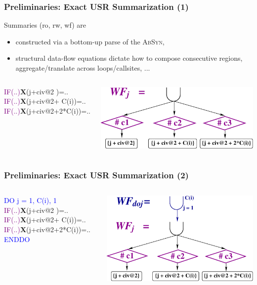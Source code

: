 \documentclass{beamer}
\newcommand{\blue}[1]{\textcolor{Blue}{{#1}}}
\newcommand{\purple}[1]{\textcolor{Purple}{{#1}}}
\begin{document}
\begin{frame}[fragile,t]
\frametitle{Preliminaries: Exact USR Summarization (1)}

Summaries ({\sc ro}, {\sc rw}, {\sc wf}) are
\begin{itemize}
    \item constructed via a bottom-up parse of the \textsc{AbSyn},
    \item structural data-flow equations dictate how to compose consecutive regions,
            aggregate/translate across loops/callsites, ...
\end{itemize}
\bigskip

\begin{columns}
\begin{colorcode}[fontsize=\small]
   \purple{IF(..)}{\bf{}X}(j+civ@2       )=..
   \purple{IF(..)}{\bf{}X}(j+civ@2+  C(i))=..
   \purple{IF(..)}{\bf{}X}(j+civ@2+2*C(i))=..
\end{colorcode}
\includegraphics[height=15ex]{Figures/WFj_USR}
\end{columns}

\end{frame}

\begin{frame}[fragile,t]
\frametitle{Preliminaries: Exact USR Summarization (2)}

\bigskip

\begin{columns}
\begin{colorcode}[fontsize=\small]
  \blue{DO j = 1, C(i), 1}
   \purple{IF(..)}{\bf{}X}(j+civ@2       )=..
   \purple{IF(..)}{\bf{}X}(j+civ@2+  C(i))=..
   \purple{IF(..)}{\bf{}X}(j+civ@2+2*C(i))=..
  \blue{ENDDO}
\end{colorcode}
\includegraphics[height=25ex]{Figures/WFdoj_USR}
\end{columns}

\end{frame}
\end{document}
